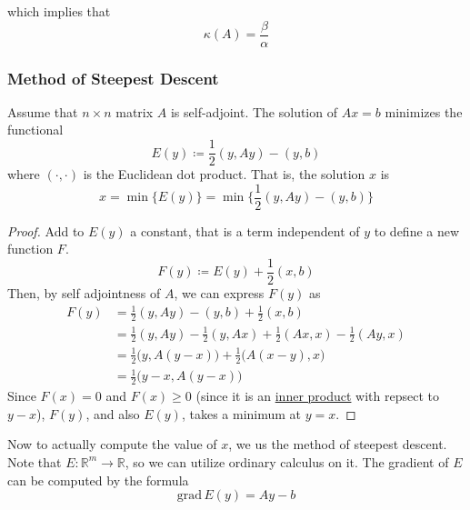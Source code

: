   which implies that
  \begin{equation}
    \kappa(A) = \frac{\beta}{\alpha}
  \end{equation}

\subsubsection{Method of Steepest Descent}

  \begin{theorem}
    \label{thm:linear-systems-as-a-variational-problem}
    Assume that $n \times n$ matrix $A$ is self-adjoint. The solution of $Ax = b$ minimizes the functional 
    \begin{equation}
      E(y) \coloneqq \frac{1}{2} (y, A y) - (y, b)
    \end{equation}
    where $(\cdot, \cdot)$ is the Euclidean dot product. That is, the solution $x$ is
    \begin{equation}
      x = \min \big\{ E(y) \big\} = \min \Big\{ \frac{1}{2} (y, Ay) - (y, b) \Big\}
    \end{equation}
  \end{theorem}
  \begin{proof}
    Add to $E(y)$ a constant, that is a term independent of $y$ to define a new function $F$. 
    \begin{equation}
      F(y) \coloneqq E(y) + \frac{1}{2} (x, b)
    \end{equation}
    Then, by self adjointness of $A$, we can express $F(y)$ as 
    \begin{align}
      F(y) & = \frac{1}{2} (y, Ay) - (y, b) + \frac{1}{2} (x, b) \\
           & = \frac{1}{2} (y, Ay) - \frac{1}{2} (y, Ax) + \frac{1}{2} (Ax, x) - \frac{1}{2} (Ay, x) \\
           & = \frac{1}{2} \big( y, A(y-x)\big) + \frac{1}{2} \big( A(x-y), x\big) \\
           & = \frac{1}{2} \big( y - x, A(y - x)\big) 
    \end{align}
    Since $F(x) = 0$ and $F(x) \geq 0$ (since it is an \hyperref[def:inner-product]{inner product} with repsect to $y-x$), $F(y)$, and also $E(y)$, takes a minimum at $y =x$. 
  \end{proof}

  Now to actually compute the value of $x$, we us the method of steepest descent. Note that $E: \mathbb{R}^m \to \mathbb{R}$, so we can utilize ordinary calculus on it. The gradient of $E$ can be computed by the formula 
  \begin{equation}
    \text{grad}\,E(y) = A y - b
  \end{equation}

